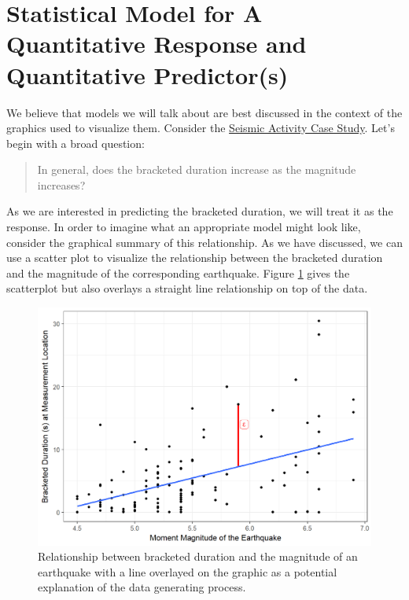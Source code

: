 \documentclass[]{book}
\theoremstyle{definition}
\theoremstyle{definition}
\theoremstyle{definition}
\theoremstyle{remark}
\begin{document}
\section{Statistical Model for A Quantitative Response and Quantitative
Predictor(s)}\label{statistical-model-for-a-quantitative-response-and-quantitative-predictors}

We believe that models we will talk about are best discussed in the
context of the graphics used to visualize them. Consider the
\protect\hyperlink{CaseGreece}{Seismic Activity Case Study}. Let's begin
with a broad question:

\begin{quote}
In general, does the bracketed duration increase as the magnitude
increases?
\end{quote}

As we are interested in predicting the bracketed duration, we will treat
it as the response. In order to imagine what an appropriate model might
look like, consider the graphical summary of this relationship. As we
have discussed, we can use a scatter plot to visualize the relationship
between the bracketed duration and the magnitude of the corresponding
earthquake. Figure \ref{fig:regmodel-slr-plot} gives the scatterplot but
also overlays a straight line relationship on top of the data.

\begin{figure}

{\centering \includegraphics[width=0.8\linewidth]{./Images/regmodel-slr-plot-1} 

}

\caption{Relationship between bracketed duration and the magnitude of an earthquake with a line overlayed on the graphic as a potential explanation of the data generating process.}\label{fig:regmodel-slr-plot}
\end{figure}
\end{document}
